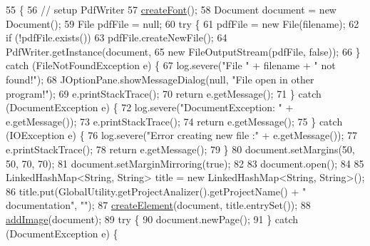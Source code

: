 \begin{DoxyCode}
55                                              \{
56         \textcolor{comment}{// setup PdfWriter}
57         \hyperlink{classit_1_1isislab_1_1masonhelperdocumentation_1_1mason_1_1control_1_1_p_d_f_generator_a403097faddc3554447db07d62b3ebfda}{createFont}();
58         Document document = \textcolor{keyword}{new} Document();
59         File pdfFile = null;
60         \textcolor{keywordflow}{try} \{
61             pdfFile = \textcolor{keyword}{new} File(filename);
62             \textcolor{keywordflow}{if} (!pdfFile.exists())
63                 pdfFile.createNewFile();
64             PdfWriter.getInstance(document,
65                     \textcolor{keyword}{new} FileOutputStream(pdfFile, \textcolor{keyword}{false}));
66         \} \textcolor{keywordflow}{catch} (FileNotFoundException e) \{
67             log.severe(\textcolor{stringliteral}{"File "} + filename + \textcolor{stringliteral}{" not found!"});
68             JOptionPane.showMessageDialog(null, \textcolor{stringliteral}{"File open in other program!"});
69             e.printStackTrace();
70             \textcolor{keywordflow}{return} e.getMessage();
71         \} \textcolor{keywordflow}{catch} (DocumentException e) \{
72             log.severe(\textcolor{stringliteral}{"DocumentException: "} + e.getMessage());
73             e.printStackTrace();
74             \textcolor{keywordflow}{return} e.getMessage();
75         \} \textcolor{keywordflow}{catch} (IOException e) \{
76             log.severe(\textcolor{stringliteral}{"Error creating new file :"} + e.getMessage());
77             e.printStackTrace();
78             \textcolor{keywordflow}{return} e.getMessage();
79         \}
80         document.setMargins(50, 50, 70, 70);
81         document.setMarginMirroring(\textcolor{keyword}{true});
82         
83         document.open();
84         
85         LinkedHashMap<String, String> title = \textcolor{keyword}{new} LinkedHashMap<String, String>();
86         title.put(GlobalUtility.getProjectAnalizer().getProjectName() + \textcolor{stringliteral}{" documentation"}, \textcolor{stringliteral}{""});
87         \hyperlink{classit_1_1isislab_1_1masonhelperdocumentation_1_1mason_1_1control_1_1_p_d_f_generator_ac98a9ab63c62a942fc1d410aab226e36}{createElement}(document, title.entrySet());
88         \hyperlink{classit_1_1isislab_1_1masonhelperdocumentation_1_1mason_1_1control_1_1_p_d_f_generator_abc1f7c0af1e9a3328d917e6e1751d421}{addImage}(document);
89         \textcolor{keywordflow}{try} \{
90             document.newPage();
91         \} \textcolor{keywordflow}{catch} (DocumentException e) \{

\end{DoxyCode}
